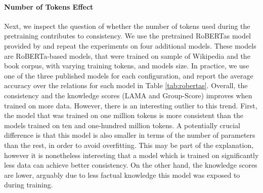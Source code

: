 \paragraph{Number of Tokens Effect}
Next, we inspect the question of whether the number of tokens used during the pretraining contributes to consistency.
We use the pretrained RoBERTas model provided by \citet{robertas} and repeat the experiments on four additional models.
These models are RoBERTa-based models, that were trained on sample of Wikipedia and the book corpus, with varying training tokens, and models size. In practice, we use one of the three published models for each configuration, and report the average accuracy over the relations for each model in Table \ref{tab:robertas}.
Overall, the consistency and the knowledge scores (LAMA and Group-Score) improves when trained on more data. However, there is an interesting outlier to this trend.
First, the model that was trained on one million tokens is more consistent than the models trained on ten and one-hundred million tokens. A potentially crucial difference is that this model is also smaller in terms of the number of parameters than the rest, in order to avoid overfitting. This may be part of the explanation, however it is nonetheless interesting that a model which is trained on significantly less data can achieve better consistency. On the other hand, the knowledge scores are lower, arguably due to less factual knowledge this model was exposed to during training.




% 

% 





